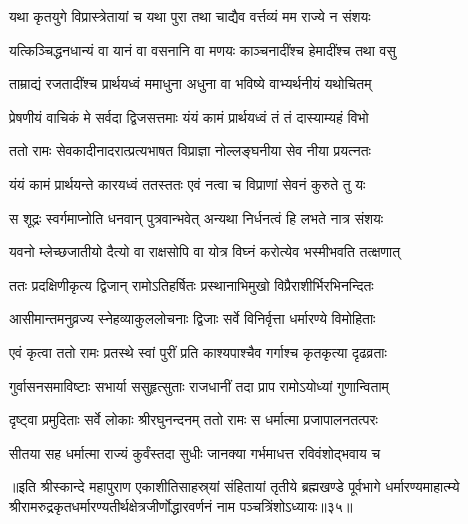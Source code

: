 \twolineshloka
{यथा कृतयुगे विप्रास्त्रेतायां च यथा पुरा}
{तथा चाद्यैव वर्त्तव्यं मम राज्ये न संशयः}%

\twolineshloka
{यत्किञ्चिद्धनधान्यं वा यानं वा वसनानि वा}
{मणयः काञ्चनादींश्च हेमादींश्च तथा वसु}%

\twolineshloka
{ताम्राद्यं रजतादींश्च प्रार्थयध्वं ममाधुना}
{अधुना वा भविष्ये वाभ्यर्थनीयं यथोचितम्}%

\twolineshloka
{प्रेषणीयं वाचिकं मे सर्वदा द्विजसत्तमाः}
{यंयं कामं प्रार्थयध्वं तं तं दास्याम्यहं विभो}%

\twolineshloka
{ततो रामः सेवकादीनादरात्प्रत्यभाषत}
{विप्राज्ञा नोल्लङ्घनीया सेव नीया प्रयत्नतः}%

\twolineshloka
{यंयं कामं प्रार्थयन्ते कारयध्वं ततस्ततः}
{एवं नत्वा च विप्राणां सेवनं कुरुते तु यः}%

\twolineshloka
{स शूद्रः स्वर्गमाप्नोति धनवान् पुत्रवान्भवेत्}
{अन्यथा निर्धनत्वं हि लभते नात्र संशयः}%

\twolineshloka
{यवनो म्लेच्छजातीयो दैत्यो वा राक्षसोपि वा}
{योत्र विघ्नं करोत्येव भस्मीभवति तत्क्षणात्}%


\twolineshloka
{ततः प्रदक्षिणीकृत्य द्विजान् रामोऽतिहर्षितः}
{प्रस्थानाभिमुखो विप्रैराशीर्भिरभिनन्दितः}%

\twolineshloka
{आसीमान्तमनुव्रज्य स्नेहव्याकुललोचनाः}
{द्विजाः सर्वे विनिर्वृत्ता धर्मारण्ये विमोहिताः}%

\twolineshloka
{एवं कृत्वा ततो रामः प्रतस्थे स्वां पुरीं प्रति}
{काश्यपाश्चैव गर्गाश्च कृतकृत्या दृढव्रताः}%

\twolineshloka
{गुर्वासनसमाविष्टाः सभार्या ससुहृत्सुताः}
{राजधानीं तदा प्राप रामोऽयोध्यां गुणान्विताम्}%

\twolineshloka
{दृष्ट्वा प्रमुदिताः सर्वे लोकाः श्रीरघुनन्दनम्}
{ततो रामः स धर्मात्मा प्रजापालनतत्परः}%

\twolineshloka
{सीतया सह धर्मात्मा राज्यं कुर्वंस्तदा सुधीः}
{जानक्या गर्भमाधत्त रविवंशोद्भवाय च}%

॥इति श्रीस्कान्दे महापुराण एकाशीतिसाहस्र्यां संहितायां तृतीये ब्रह्मखण्डे पूर्वभागे धर्मारण्यमाहात्म्ये श्रीरामरुद्रकृतधर्मारण्यतीर्थक्षेत्रजीर्णोद्धारवर्णनं नाम पञ्चत्रिंशोऽध्यायः॥३५॥